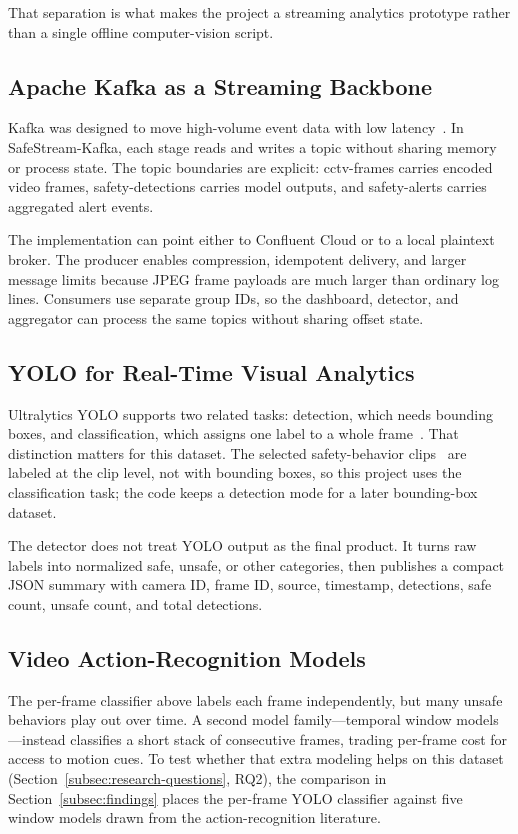 \documentclass[conference]{IEEEtran}
\begin{document}
That separation is what makes the project a streaming analytics prototype rather than a single offline computer-vision script.

\subsection{Apache Kafka as a Streaming Backbone}

Kafka was designed to move high-volume event data with low latency~\cite{b3}. In SafeStream-Kafka, each stage reads and writes a topic without sharing memory or process state. The topic boundaries are explicit: cctv-frames carries encoded video frames, safety-detections carries model outputs, and safety-alerts carries aggregated alert events.

The implementation can point either to Confluent Cloud or to a local plaintext broker. The producer enables compression, idempotent delivery, and larger message limits because JPEG frame payloads are much larger than ordinary log lines. Consumers use separate group IDs, so the dashboard, detector, and aggregator can process the same topics without sharing offset state.

\subsection{YOLO for Real-Time Visual Analytics}
Ultralytics YOLO supports two related tasks: detection, which needs bounding boxes, and classification, which assigns one label to a whole frame~\cite{b4,b5}. That distinction matters for this dataset. The selected safety-behavior clips~\cite{b6} are labeled at the clip level, not with bounding boxes, so this project uses the classification task; the code keeps a detection mode for a later bounding-box dataset.

The detector does not treat YOLO output as the final product. It turns raw labels into normalized safe, unsafe, or other categories, then publishes a compact JSON summary with camera ID, frame ID, source, timestamp, detections, safe count, unsafe count, and total detections.

\subsection{Video Action-Recognition Models}
\label{subsec:action-models}

The per-frame classifier above labels each frame independently, but many
unsafe behaviors play out over time. A second model family---temporal
window models---instead classifies a short stack of consecutive frames,
trading per-frame cost for access to motion cues. To test whether that
extra modeling helps on this dataset (Section~\ref{subsec:research-questions},
RQ2), the comparison in Section~\ref{subsec:findings} places the per-frame
YOLO classifier against five window models drawn from the
action-recognition literature.
\end{document}

